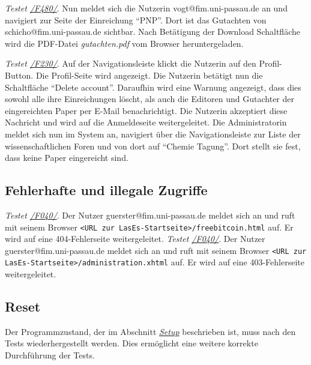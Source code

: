 \begin{description}

	 \emph{Testet \hyperref[funkt:480]{/F480/}}.
	Nun meldet sich die Nutzerin vogt@fim.uni-passau.de an und navigiert zur Seite der Einreichung ``P\neq NP''.
	Dort ist das Gutachten von schicho@fim.uni-passau.de sichtbar.
	Nach Betätigung der Download Schaltfläche wird die PDF-Datei \emph{gutachten.pdf} vom Browser heruntergeladen.

	 \emph{Testet \hyperref[funkt:230]{/F230/}}.
	Auf der Navigationsleiste klickt die Nutzerin auf den Profil-Button.
	Die Profil-Seite wird angezeigt.
	Die Nutzerin betätigt nun die Schaltfläche ``Delete account''.
	Daraufhin wird eine Warnung angezeigt, dass dies sowohl alle ihre Einreichungen löscht, als auch die Editoren und Gutachter der eingereichten Paper per E-Mail benachrichtigt.
	Die Nutzerin akzeptiert diese Nachricht und wird auf die Anmeldeseite weitergeleitet.
	Die Administratorin meldet sich nun im System an, navigiert über die Navigationsleiste zur Liste der wissenschaftlichen Foren und von dort auf ``Chemie Tagung''.
	Dort stellt sie fest, dass keine Paper eingereicht sind.

\end{description}

\subsection{Fehlerhafte und illegale Zugriffe}

\begin{description}
	 \emph{Testet \hyperref[funkt:040]{/F040/}}.
	Der Nutzer guerster@fim.uni-passau.de meldet sich an und ruft mit seinem Browser \texttt{<URL zur LasEs-Startseite>/freebitcoin.html} auf.
	Er wird auf eine 404-Fehlerseite weitergeleitet.
	 \emph{Testet \hyperref[funkt:040]{/F040/}}.
	Der Nutzer guerster@fim.uni-passau.de meldet sich an und ruft mit seinem Browser \texttt{<URL zur LasEs-Startseite>/administration.xhtml} auf.
	Er wird auf eine 403-Fehlerseite weitergeleitet.
\end{description}

\subsection{Reset}
Der Programmzustand, der im Abschnitt \emph{\hyperref[setup]{Setup}} beschrieben ist, muss nach den Tests wiederhergestellt werden.
Dies ermöglicht eine weitere korrekte Durchführung der Tests.



